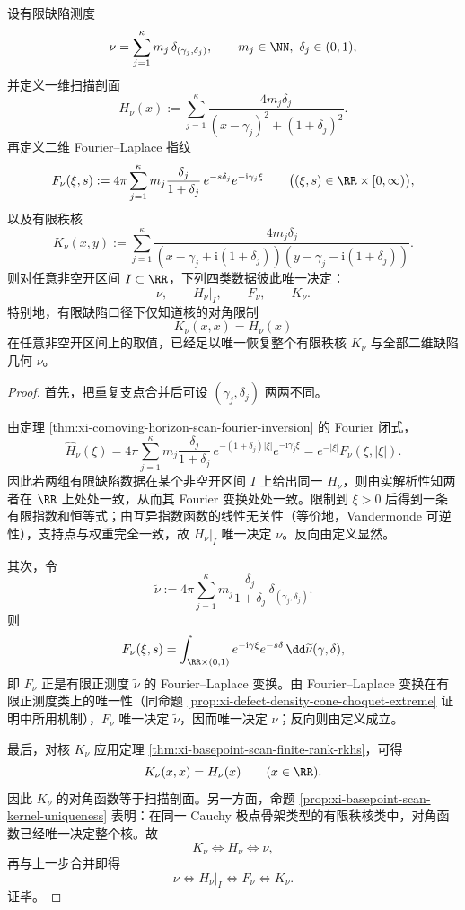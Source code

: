 \begin{theorem}\label{thm:xi-time-part9xd-finite-defect-diagonal-rigidity-fingerprint-kernel}
设有限缺陷测度
\[
\nu=\sum_{j=1}^{\kappa}m_j\,\delta_{(\gamma_j,\delta_j)},
\qquad
m_j\in\NN,\ \delta_j\in(0,1),
\]
并定义一维扫描剖面
\[
H_\nu(x):=\sum_{j=1}^{\kappa}\frac{4m_j\delta_j}{(x-\gamma_j)^2+(1+\delta_j)^2}.
\]
再定义二维 Fourier--Laplace 指纹
\[
F_\nu(\xi,s):=
4\pi\sum_{j=1}^{\kappa}
m_j\frac{\delta_j}{1+\delta_j}\,
e^{-s\delta_j}e^{-\mathrm{i}\gamma_j\xi}
\qquad
\bigl((\xi,s)\in\RR\times[0,\infty)\bigr),
\]
以及有限秩核
\[
K_\nu(x,y):=
\sum_{j=1}^{\kappa}
\frac{4m_j\delta_j}
{(x-\gamma_j+\mathrm{i}(1+\delta_j))(y-\gamma_j-\mathrm{i}(1+\delta_j))}.
\]
则对任意非空开区间 \(I\subset\RR\)，下列四类数据彼此唯一决定：
\[
\nu,
\qquad
\left.H_\nu\right|_I,
\qquad
F_\nu,
\qquad
K_\nu.
\]
特别地，有限缺陷口径下仅知道核的对角限制
\[
K_\nu(x,x)=H_\nu(x)
\]
在任意非空开区间上的取值，已经足以唯一恢复整个有限秩核 \(K_\nu\) 与全部二维缺陷几何 \(\nu\)。
\end{theorem}

\begin{proof}
首先，把重复支点合并后可设 \((\gamma_j,\delta_j)\) 两两不同。

由定理 \ref{thm:xi-comoving-horizon-scan-fourier-inversion} 的 Fourier 闭式，
\[
\widehat H_\nu(\xi)
=
4\pi\sum_{j=1}^{\kappa}
m_j\frac{\delta_j}{1+\delta_j}\,
e^{-(1+\delta_j)|\xi|}e^{-\mathrm{i}\gamma_j\xi}
=
e^{-|\xi|}F_\nu(\xi,|\xi|).
\]
因此若两组有限缺陷数据在某个非空开区间 \(I\) 上给出同一 \(H_\nu\)，则由实解析性知两者在 \(\RR\) 上处处一致，从而其 Fourier 变换处处一致。限制到 \(\xi>0\) 后得到一条有限指数和恒等式；由互异指数函数的线性无关性（等价地，Vandermonde 可逆性），支持点与权重完全一致，故 \(\left.H_\nu\right|_I\) 唯一决定 \(\nu\)。反向由定义显然。

其次，令
\[
\widetilde\nu:=
4\pi\sum_{j=1}^{\kappa}
m_j\frac{\delta_j}{1+\delta_j}\,
\delta_{(\gamma_j,\delta_j)}.
\]
则
\[
F_\nu(\xi,s)=\int_{\RR\times(0,1)}e^{-\mathrm{i}\gamma\xi}e^{-s\delta}\,\dd\widetilde\nu(\gamma,\delta),
\]
即 \(F_\nu\) 正是有限正测度 \(\widetilde\nu\) 的 Fourier--Laplace 变换。由 Fourier--Laplace 变换在有限正测度类上的唯一性（同命题 \ref{prop:xi-defect-density-cone-choquet-extreme} 证明中所用机制），\(F_\nu\) 唯一决定 \(\widetilde\nu\)，因而唯一决定 \(\nu\)；反向则由定义成立。

最后，对核 \(K_\nu\) 应用定理 \ref{thm:xi-basepoint-scan-finite-rank-rkhs}，可得
\[
K_\nu(x,x)=H_\nu(x)\qquad (x\in\RR).
\]
因此 \(K_\nu\) 的对角函数等于扫描剖面。另一方面，命题 \ref{prop:xi-basepoint-scan-kernel-uniqueness} 表明：在同一 Cauchy 极点骨架类型的有限秩核类中，对角函数已经唯一决定整个核。故
\[
K_\nu\Longleftrightarrow H_\nu\Longleftrightarrow \nu,
\]
再与上一步合并即得
\[
\nu
\Longleftrightarrow
\left.H_\nu\right|_I
\Longleftrightarrow
F_\nu
\Longleftrightarrow
K_\nu.
\]
证毕。
\end{proof}

